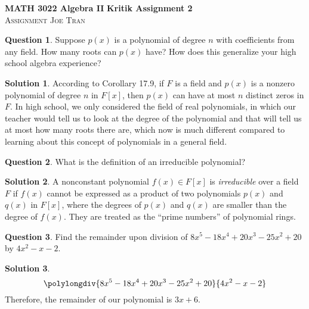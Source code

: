 \documentclass[11pt]{article}
\theoremstyle{definition}\newtheorem{definition}{Definition}
\theoremstyle{definition}\newtheorem{question}{Question}
\theoremstyle{definition}\newtheorem*{solution}{Solution}
\theoremstyle{definition}\newtheorem{example}{Example}
\theoremstyle{definition}\newtheorem{notation}{Notation}
\theoremstyle{theorem}\newtheorem{theorem}{Theorem}
\theoremstyle{theorem}\newtheorem{corollary}{Corollary}
\theoremstyle{theorem}\newtheorem{lemma}{Lemma}
\theoremstyle{theorem}\newtheorem{proposition}{Proposition}
\begin{document}
\noindent \textbf{MATH 3022 Algebra II} \hfill \textbf{Kritik Assignment 2} \\
\textsc{Assignment} \hfill \textsc{Joe Tran}

\begin{question}
    Suppose $p(x)$ is a polynomial of degree $n$ with coefficients from any field. How many roots can $p(x)$ have? How does this generalize your high school algebra experience?
\end{question}

\begin{solution}
    According to Corollary 17.9, if $F$ is a field and $p(x)$ is a nonzero polynomial of degree $n$ in $F[x]$, then $p(x)$ can have at most $n$ distinct zeros in $F$. In high school, we only considered the field of real polynomials, in which our teacher would tell us to look at the degree of the polynomial and that will tell us at most how many roots there are, which now is much different compared to learning about this concept of polynomials in a general field.
\end{solution}

\begin{question}
    What is the definition of an irreducible polynomial?
\end{question}

\begin{solution}
    A nonconstant polynomial $f(x) \in F[x]$ is \emph{irreducible} over a field $F$ if $f(x)$ cannot be expressed as a product of two polynomials $p(x)$ and $q(x)$ in $F[x]$, where the degrees of $p(x)$ and $q(x)$ are smaller than the degree of $f(x)$. They are treated as the ``prime numbers'' of polynomial rings.
\end{solution}

\begin{question}
    Find the remainder upon division of $8x^5 - 18x^4 + 20x^3 - 25x^2 + 20$ by $4x^2 - x - 2$.
\end{question}

\begin{solution}
    \begin{equation*}
        \polylongdiv{8x^5 - 18x^4 + 20x^3 - 25x^2 + 20}{4x^2 - x - 2}
    \end{equation*}
    Therefore, the remainder of our polynomial is $3x + 6$.
\end{solution}
\end{document}
